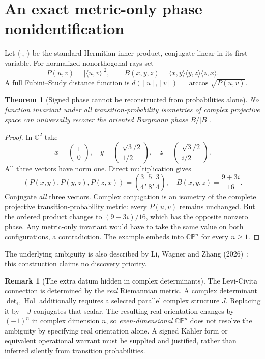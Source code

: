 \documentclass[10pt,letterpaper]{article}
\theoremstyle{plain}\newtheorem{theorem}{Theorem}\newtheorem{proposition}{Proposition}
\theoremstyle{definition}\newtheorem{remark}{Remark}
\begin{document}
\section{An exact metric-only phase nonidentification}
Let $\langle \cdot,\cdot\rangle$ be the standard Hermitian inner product, conjugate-linear in its first variable. For normalized nonorthogonal rays set
\begin{equation}
P(u,v)=|\langle u,v\rangle|^2,\qquad
B(x,y,z)=\langle x,y\rangle\langle y,z\rangle\langle z,x\rangle.
\end{equation}
A full Fubini--Study distance function is $d([u],[v])=\arccos\sqrt{P(u,v)}$.
\begin{theorem}[Signed phase cannot be reconstructed from probabilities alone]
No function invariant under all transition-probability isometries of complex projective space can universally recover the oriented Bargmann phase $B/|B|$.
\end{theorem}
\begin{proof}
In $\mathbb C^2$ take
\[
x=\begin{pmatrix}1\\0\end{pmatrix},\quad
y=\begin{pmatrix}\sqrt 3/2\\1/2\end{pmatrix},\quad
z=\begin{pmatrix}\sqrt 3/2\\i/2\end{pmatrix}.
\]
All three vectors have norm one. Direct multiplication gives
\[
(P(x,y),P(y,z),P(z,x))=\left(\frac34,\frac58,\frac34\right),\quad
B(x,y,z)=\frac{9+3i}{16}.
\]
Conjugate \emph{all} three vectors. Complex conjugation is an isometry of the complete projective transition-probability metric: every $P(u,v)$ remains unchanged. But the ordered product changes to $(9-3i)/16$, which has the opposite nonzero phase. Any metric-only invariant would have to take the same value on both configurations, a contradiction. The example embeds into $\mathbb{CP}^{n}$ for every $n\ge1$.
\end{proof}
The underlying ambiguity is also described by Li, Wagner and Zhang (2026)~\cite{Li2026}; this construction claims no discovery priority.

\begin{remark}[The extra datum hidden in complex determinants]
The Levi-Civita connection is determined by the \emph{real} Riemannian metric. A complex determinant $\det_{\mathbb C}\operatorname{Hol}$ additionally requires a selected parallel complex structure $J$. Replacing it by $-J$ conjugates that scalar. The resulting real orientation changes by $(-1)^n$ in complex dimension $n$, so \emph{even-dimensional} $\mathbb{CP}^n$ does not resolve the ambiguity by specifying real orientation alone. A signed K\"ahler form or equivalent operational warrant must be supplied and justified, rather than inferred silently from transition probabilities.
\end{remark}
\end{document}
